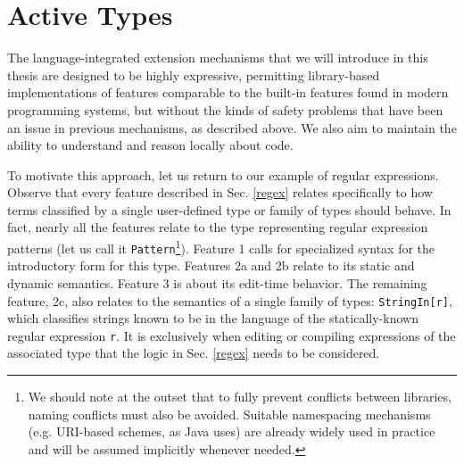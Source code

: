 \section{Active Types}\label{contributions}
The language-integrated extension mechanisms that we will introduce in this thesis are designed to be highly {expressive}, permitting library-based implementations of features comparable to the built-in features found in modern programming systems, but without the kinds of {safety} problems that have been an issue in previous mechanisms, as described above. We also aim to maintain the ability to understand and reason locally about code. %

To motivate this approach, let us return to our example of regular expressions. Observe that every feature described in Sec. \ref{regex} relates specifically to how terms  classified by a single user-defined type or family of types should behave. In fact, nearly all the features relate to the type representing regular expression patterns (let us call it \verb|Pattern|\footnote{We should note at the outset that to fully prevent conflicts between libraries, naming conflicts must also be avoided. Suitable namespacing mechanisms (e.g. URI-based schemes, as Java uses) are already widely used in practice  and will be assumed implicitly whenever needed.}). Feature 1 calls for specialized syntax for the introductory form for this type. Features 2a and 2b relate to its static and dynamic semantics. Feature 3 is about its edit-time behavior. The remaining feature, 2c, also relates to the semantics of a single family of types: \verb|StringIn[r]|, which classifies strings known to be in the language of the statically-known regular expression \verb|r|. It is exclusively when editing or compiling expressions of the associated type that the logic in Sec. \ref{regex}  needs to be considered. 

